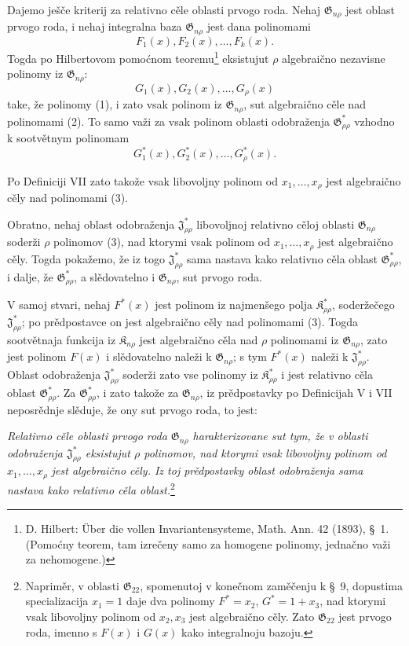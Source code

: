 \documentclass[11pt]{article}
\providecommand{\Kfield}{\mathfrak{K}}
\providecommand{\Jdom}{\mathfrak{J}}
\providecommand{\Gdom}{\mathfrak{G}}
\begin{document}
Dajemo ješče kriterij za relativno cěle oblasti prvogo roda. Nehaj $\Gdom_{n\rho}$ jest oblast prvogo roda, i nehaj integralna baza $\Gdom_{n\rho}$ jest dana polinomami
\begin{equation}
  F_1(x),F_2(x),\ldots,F_k(x).
\tag{1}
\end{equation}
Togda po Hilbertovom pomoćnom teoremu\footnote{D. Hilbert: Über die vollen Invariantensysteme, Math. Ann. 42 (1893), \S\ 1. (Pomoćny teorem, tam izrečeny samo za homogene polinomy, jednačno važi za nehomogene.)} eksistujut $\rho$ algebraično nezavisne polinomy iz $\Gdom_{n\rho}$:
\begin{equation}
  G_1(x),G_2(x),\ldots,G_\rho(x)
\tag{2}
\end{equation}
take, že polinomy (1), i zato vsak polinom iz $\Gdom_{n\rho}$, sut algebraično cěle nad polinomami (2). To samo važi za vsak polinom oblasti odobraženja $\Gdom^*_{\rho\rho}$ vzhodno k sootvětnym polinomam
\begin{equation}
  G_1^*(x),G_2^*(x),\ldots,G_\rho^*(x).
\tag{3}
\end{equation}

Po Definiciji VII zato takože vsak libovoljny polinom od $x_1,\ldots,x_\rho$ jest algebraično cěly nad polinomami (3).

Obratno, nehaj oblast odobraženja $\Jdom^*_{\rho\rho}$ libovoljnoj relativno cěloj oblasti $\Gdom_{n\rho}$ soderži $\rho$ polinomov (3), nad ktorymi vsak polinom od $x_1,\ldots,x_\rho$ jest algebraično cěly. Togda pokažemo, že iz togo $\Jdom^*_{\rho\rho}$ sama nastava kako relativno cěla oblast $\Gdom^*_{\rho\rho}$, i dalje, že $\Gdom^*_{\rho\rho}$, a slědovatelno i $\Gdom_{n\rho}$, sut prvogo roda.

V samoj stvari, nehaj $F^*(x)$ jest polinom iz najmenšego polja $\Kfield^*_{\rho\rho}$, soderžečego $\Jdom^*_{\rho\rho}$; po prědpostavce on jest algebraično cěly nad polinomami (3). Togda sootvětnaja funkcija iz $\Kfield_{n\rho}$ jest algebraično cěla nad $\rho$ polinomami iz $\Gdom_{n\rho}$, zato jest polinom $F(x)$ i slědovatelno naleži k $\Gdom_{n\rho}$; s tym $F^*(x)$ naleži k $\Jdom^*_{\rho\rho}$. Oblast odobraženja $\Jdom^*_{\rho\rho}$ soderži zato vse polinomy iz $\Kfield^*_{\rho\rho}$ i jest relativno cěla oblast $\Gdom^*_{\rho\rho}$. Za $\Gdom^*_{\rho\rho}$, i zato takože za $\Gdom_{n\rho}$, iz prědpostavky po Definicijah V i VII neposrědnje slěduje, že ony sut prvogo roda, to jest:

{\itshape Relativno cěle oblasti prvogo roda $\Gdom_{n\rho}$ harakterizovane sut tym, že v oblasti odobraženja $\Jdom^*_{\rho\rho}$ eksistujut $\rho$ polinomov, nad ktorymi vsak libovoljny polinom od $x_1,\ldots,x_\rho$ jest algebraično cěly. Iz toj prědpostavky oblast odobraženja sama nastava kako relativno cěla oblast.}\footnote{Napriměr, v oblasti $\Gdom_{22}$, spomenutoj v konečnom zaměčenju k \S\ 9, dopustima specializacija $x_1=1$ daje dva polinomy $F^*=x_2$, $G^*=1+x_3$, nad ktorymi vsak libovoljny polinom od $x_2,x_3$ jest algebraično cěly. Zato $\Gdom_{22}$ jest prvogo roda, imenno s $F(x)$ i $G(x)$ kako integralnoju bazoju.}
\end{document}
